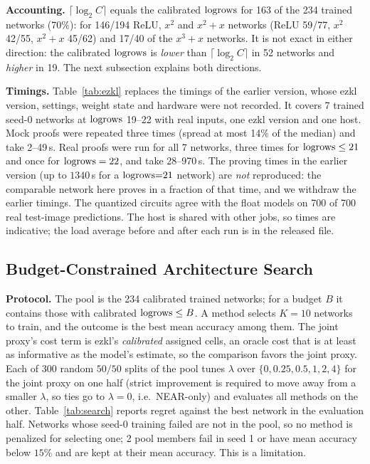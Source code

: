 \textbf{Accounting.}  $\lceil\log_2 C\rceil$ equals the calibrated $\mathrm{logrows}$ for 163 of the 234 trained networks (70\%): for 146/194 ReLU, $x^2$ and $x^2{+}x$ networks (ReLU 59/77, $x^2$ 42/55, $x^2{+}x$ 45/62) and
17/40 of the $x^3{+}x$ networks.  It is not exact in either direction: the calibrated $\mathrm{logrows}$ is \emph{lower} than $\lceil\log_2 C\rceil$ in 52 networks and \emph{higher} in 19.  The next subsection explains both directions.

\textbf{Timings.}  Table~\ref{tab:ezkl} replaces the timings of the earlier version, whose ezkl version, settings, weight state and hardware were not recorded.  It covers 7 trained seed-0 networks at $\mathrm{logrows}$ 19--22
with real inputs, one ezkl version and one host.  Mock proofs were repeated three times (spread at most 14\% of the median) and take 2--49\,s.
Real proofs were run for all 7 networks, three times for $\mathrm{logrows}\le21$ and once for $\mathrm{logrows}=22$, and take 28--970\,s.
The proving times in the earlier version (up to $1340$\,s for a $\mathrm{logrows}{=}21$ network) are \emph{not} reproduced: the comparable network here proves in a fraction of that time, and we withdraw the earlier timings.
The quantized circuits agree with the float models on 700 of 700 real test-image predictions.  The host is shared with other jobs, so times are indicative; the load average before and after each run is in the released file.




\subsection{Budget-Constrained Architecture Search}

\textbf{Protocol.}  The pool is the 234 calibrated trained networks; for a budget $B$ it contains those with calibrated $\mathrm{logrows}\le B$.  A method selects $K=10$ networks to train, and the outcome is the best mean accuracy among them.
The joint proxy's cost term is ezkl's \emph{calibrated} assigned cells, an oracle cost that is at least as informative as the model's estimate, so the comparison favors the joint proxy.
Each of 300 random $50/50$ splits of the pool tunes $\lambda$ over $\{0,0.25,0.5,1,2,4\}$ for the joint proxy on one half (strict improvement is required to move away from a smaller $\lambda$, so ties go to $\lambda=0$, i.e.\ NEAR-only) and evaluates all methods on the other.  Table~\ref{tab:search} reports regret against the best network in the evaluation half.
Networks whose seed-0 training failed are not in the pool, so no method is penalized for selecting one; 2 pool members fail in seed 1 or have mean accuracy below $15\%$ and are kept at their mean accuracy.  This is a limitation.

